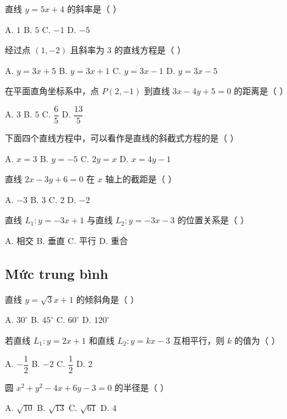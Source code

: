 \documentclass[11pt, a4paper]{article}
\begin{document}
\begin{baitap}[1]
直线 $y = 5x + 4$ 的斜率是（ ）
\par\vspace{3pt}
\noindent A. $1$ \quad B. $5$ \quad C. $-1$ \quad D. $-5$
\end{baitap}
\begin{baitap}[2]
经过点 $(1, -2)$ 且斜率为 $3$ 的直线方程是（ ）
\par\vspace{3pt}
\noindent A. $y = 3x + 5$ \quad B. $y = 3x + 1$ \quad C. $y = 3x - 1$ \quad D. $y = 3x - 5$
\end{baitap}
\begin{baitap}[3]
在平面直角坐标系中，点 $P(2,-1)$ 到直线 $3x - 4y + 5 = 0$ 的距离是（ ）
\par\vspace{3pt}
\noindent A. $3$ \quad B. $5$ \quad C. $\dfrac{6}{5}$ \quad D. $\dfrac{13}{5}$
\end{baitap}
\begin{baitap}[4]
下面四个直线方程中，可以看作是直线的斜截式方程的是（ ）
\par\vspace{3pt}
\noindent A. $x = 3$ \quad B. $y = -5$ \quad C. $2y = x$ \quad D. $x = 4y - 1$
\end{baitap}
\begin{baitap}[5]
直线 $2x - 3y + 6 = 0$ 在 $x$ 轴上的截距是（ ）
\par\vspace{3pt}
\noindent A. $-3$ \quad B. $3$ \quad C. $2$ \quad D. $-2$
\end{baitap}
\begin{baitap}[6]
直线 $L_1: y = -3x + 1$ 与直线 $L_2: y = -3x - 3$ 的位置关系是（ ）
\par\vspace{3pt}
\noindent A. 相交 \quad B. 垂直 \quad C. 平行 \quad D. 重合
\end{baitap}
\subsection{Mức trung bình}

\begin{baitap}[7]
直线 $y = \sqrt{3}x + 1$ 的倾斜角是（ ）
\par\vspace{3pt}
\noindent A. $30^\circ$ \quad B. $45^\circ$ \quad C. $60^\circ$ \quad D. $120^\circ$
\end{baitap}
\begin{baitap}[8]
若直线 $L_1: y = 2x + 1$ 和直线 $L_2: y = kx - 3$ 互相平行，则 $k$ 的值为（ ）
\par\vspace{3pt}
\noindent A. $-\dfrac{1}{2}$ \quad B. $-2$ \quad C. $\dfrac{1}{2}$ \quad D. $2$
\end{baitap}
\begin{baitap}[9]
圆 $x^2 + y^2 - 4x + 6y - 3 = 0$ 的半径是（ ）
\par\vspace{3pt}
\noindent A. $\sqrt{10}$ \quad B. $\sqrt{13}$ \quad C. $\sqrt{61}$ \quad D. $4$
\end{baitap}
\end{document}
